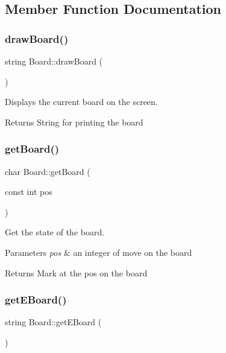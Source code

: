 \subsection{Member Function Documentation}
\mbox{\label{classBoard_a8fb1cd277d1dd029baeda80ec8e65756}} 
\subsubsection{\texorpdfstring{draw\+Board()}{drawBoard()}}
{\footnotesize\ttfamily string Board\+::draw\+Board (\begin{DoxyParamCaption}{ }\end{DoxyParamCaption})}



Displays the current board on the screen. 

\begin{DoxyReturn}{Returns}
String for printing the board 
\end{DoxyReturn}
\mbox{\label{classBoard_af7e9c87bb428473eb051ca19ee36ca95}} 
\subsubsection{\texorpdfstring{get\+Board()}{getBoard()}}
{\footnotesize\ttfamily char Board\+::get\+Board (\begin{DoxyParamCaption}\item[{const int}]{pos }\end{DoxyParamCaption})}



Get the state of the board. 


\begin{DoxyParams}{Parameters}
{\em pos} & an integer of move on the board \\
\hline
\end{DoxyParams}
\begin{DoxyReturn}{Returns}
Mark at the pos on the board 
\end{DoxyReturn}
\mbox{\label{classBoard_a3707ab499357d887c1be4e2bbb477891}} 
\subsubsection{\texorpdfstring{get\+E\+Board()}{getEBoard()}}
{\footnotesize\ttfamily string Board\+::get\+E\+Board (\begin{DoxyParamCaption}{ }\end{DoxyParamCaption})\hspace{0.3cm}{\ttfamily [virtual]}}



